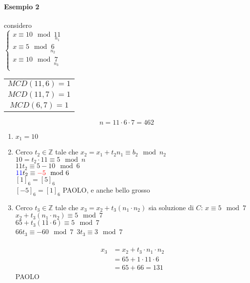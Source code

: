 \paragraph{Esempio 2} considero\\

$
\begin{cases}
    x\equiv 10\mod \underset{n_1}{11} \\
    x\equiv 5\mod \underset{n_2}{6} \\
    x\equiv 10\mod \underset{n_3}{7} \\
\end{cases}
$
\begin{tabular}{c}
    $MCD(11,6)=1$\\
    $MCD(11,7)=1$\\
    $MCD(6,7)=1$
\end{tabular}
$$n=11\cdot 6\cdot 7= 462$$
\begin{enumerate}
    \item $x_1=10$
    \item Cerco $t_2\in\mathbb{Z}$ tale che $x_2=x_1+t_2n_1\equiv b_2\mod n_2$\\
        $10=t_2\cdot 11\equiv 5\mod n$\\
        $11t_2\equiv 5-10 \mod 6$\\
        ${\color{blue}11}t_2\equiv {\color{red}-5} \mod 6$\\
        {\tiny
        {\color{blue}$[1]_6=[5]_6$}\\
        {\color{red}$[-5]_6=[1]_6$}
        }
        {\color{purple}PAOLO, e anche bello grosso}
    \item Cerco $t_3\in\mathbb{Z}$ tale che  $x_3=x_2+t_3(n_1\cdot n_2)$ 
        sia soluzione di $C$: $x\equiv 5\mod 7$\\
        $x_2+t_3(n_1\cdot n_2)\equiv 5\mod 7$\\
        $65+t_3(11\cdot 6)\equiv 5\mod 7 $\\
        $66t_3\equiv -60\mod 7 $\
        $3t_3\equiv 3\mod 7$\\\\

        \begin{align*}
            x_3 & =x_2+t_3\cdot n_1\cdot n_2\\
                & =65+1\cdot 11\cdot 6\\
                & =65+66=131
        \end{align*}
        {\color{purple} PAOLO}
\end{enumerate}
